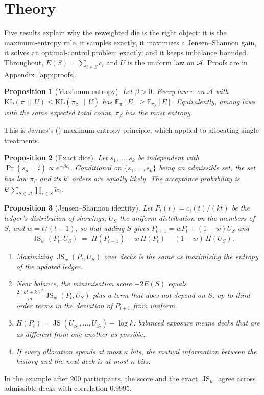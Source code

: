 \documentclass[11pt]{article}
\newtheorem{proposition}{Proposition}
\newcommand{\A}{\mathcal{A}}
\newcommand{\KL}{\mathrm{KL}}
\newcommand{\Unif}{U}
\newcommand{\E}{\mathbb{E}}
\DeclareMathOperator{\JS}{JS}
\begin{document}
\section{Theory}\label{sec:theory}

Five results explain why the reweighted die is the right object: it is the maximum-entropy rule, it samples exactly, it maximizes a Jensen--Shannon gain, it solves an optimal-control problem exactly, and it keeps imbalance bounded. Throughout, $E(S) = \sum_{i\in S}c_i$ and $\Unif$ is the uniform law on $\A$. Proofs are in Appendix~\ref{app:proofs}.

\begin{proposition}[Maximum entropy]\label{prop:maxent}
Let $\beta>0$. Every law $\pi$ on $\A$ with $\KL(\pi\,\|\,\Unif)\le\KL(\pi_\beta\,\|\,\Unif)$ has $\E_\pi[E]\ge\E_{\pi_\beta}[E]$. Equivalently, among laws with the same expected total count, $\pi_\beta$ has the most entropy.
\end{proposition}
This is Jaynes's (\citeyear{jaynes1957}) maximum-entropy principle, which \citet{klotz1978} applied to allocating single treatments.

\begin{proposition}[Exact dice]\label{prop:dice}
Let $s_1,\dots,s_k$ be independent with $\Pr(s_p=i)\propto e^{-\beta c_i}$. Conditional on $\{s_1,\dots,s_k\}$ being an admissible set, the set has law $\pi_\beta$ and its $k!$ orders are equally likely. The acceptance probability is $k!\sum_{S\in\A}\prod_{i\in S}\tilde w_i$.
\end{proposition}

\begin{proposition}[Jensen--Shannon identity]\label{prop:js}
Let $P_t(i)=c_i(t)/(kt)$ be the ledger's distribution of showings, $U_S$ the uniform distribution on the members of $S$, and $w=t/(t+1)$, so that adding $S$ gives $P_{t+1}=wP_t+(1-w)U_S$ and
\[
\JS_w(P_t,U_S) \;=\; H(P_{t+1}) - w\,H(P_t) - (1-w)\,H(U_S).
\]
\begin{enumerate}
\item[(a)] Maximizing $\JS_w(P_t,U_S)$ over decks is the same as maximizing the entropy of the updated ledger.
\item[(b)] Near balance, the minimisation score $-2E(S)$ equals $\frac{2(kt+k)^2}{m}\JS_w(P_t,U_S)$ plus a term that does not depend on $S$, up to third-order terms in the deviation of $P_{t+1}$ from uniform.
\item[(c)] $H(P_t) = \JS(U_{S_1},\dots,U_{S_t}) + \log k$: balanced exposure means decks that are as different from one another as possible.
\item[(d)] If every allocation spends at most $\kappa$ bits, the mutual information between the history and the next deck is at most $\kappa$ bits.
\end{enumerate}
\end{proposition}
In the example after 200 participants, the score and the exact $\JS_w$ agree across admissible decks with correlation 0.9995.
\end{document}
